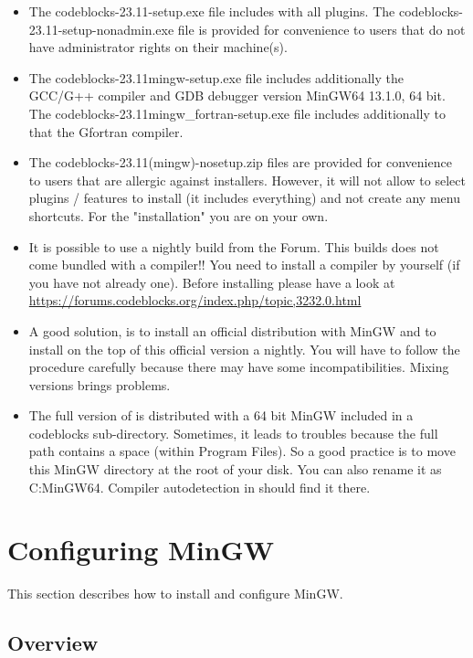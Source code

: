 \begin{itemize}
\item The codeblocks-23.11-setup.exe file includes \codeblocks with all plugins. The codeblocks-23.11-setup-nonadmin.exe file is provided for convenience to users that do not have administrator rights on their machine(s).
\item The codeblocks-23.11mingw-setup.exe file includes additionally the GCC/G++ compiler and GDB debugger version MinGW64 13.1.0, 64 bit. The codeblocks-23.11mingw\_fortran-setup.exe file includes additionally to that the Gfortran compiler.
\item The codeblocks-23.11(mingw)-nosetup.zip files are provided for convenience to users that are allergic against installers. However, it will not allow to select plugins / features to install (it includes everything) and not create any menu shortcuts. For the "installation" you are on your own.
\item It is possible to use a nightly build from the Forum. This builds does not come bundled with a compiler!! You need to install a compiler by yourself (if you have not already one). Before installing please have a look at \url{https://forums.codeblocks.org/index.php/topic,3232.0.html} 
\item A good solution, is to install an official distribution with MinGW and to install on the top of this official version a nightly. You will have to follow the procedure carefully because there may have some incompatibilities. Mixing versions brings problems. 
\item The full version of \codeblocks is distributed with a 64 bit MinGW included in a codeblocks sub-directory. Sometimes, it leads to troubles because the full path contains a space (within Program Files). So a good practice is to move this MinGW directory at the root of your disk. You can also rename it as C:\osp MinGW64. Compiler autodetection in \codeblocks should find it there.
\end{itemize}

\section{Configuring MinGW}

This section describes how to install and configure MinGW.

\subsection{Overview}

